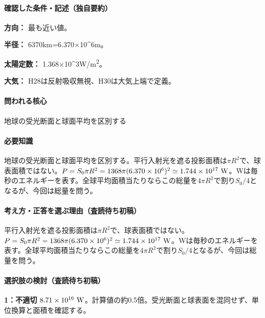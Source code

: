 \paragraph{確認した条件・記述（独自要約）}\mbox{}\par

\noindent\textbf{方向：} 最も近い値。\par

\noindent\textbf{半径：} 6370km=\allowbreak{}6.370×10\textasciicircum{}6m。\par

\noindent\textbf{太陽定数：} 1.368×10\textasciicircum{}3W/m\textsuperscript{2}。\par

\noindent\textbf{大気：} H28は反射吸収無視、H30は大気上端で定義。\par

\paragraph{問われる核心} 地球の受光断面と球面平均を区別する

\paragraph{必要知識} 地球の受光断面と球面平均を区別する。平行入射光を遮る投影面積は\(\pi R^2\)で、球表面積ではない。\(P=S_0\pi R^2=1368\pi(6.370\times10^6)^2\simeq1.744\times10^{17}\ {\rm W}\)。Wは毎秒のエネルギーを表す。全球平均面積当たりならこの総量を\(4\pi R^2\)で割り\(S_0/4\)となるが、今回は総量を問う。

\paragraph{考え方・正答を選ぶ理由（査読待ち初稿）} 平行入射光を遮る投影面積は\(\pi R^2\)で、球表面積ではない。\(P=S_0\pi R^2=1368\pi(6.370\times10^6)^2\simeq1.744\times10^{17}\ {\rm W}\)。Wは毎秒のエネルギーを表す。全球平均面積当たりならこの総量を\(4\pi R^2\)で割り\(S_0/4\)となるが、今回は総量を問う。

\paragraph{選択肢の検討（査読待ち初稿）}\mbox{}\par

\noindent\textbf{1：不適切} \(8.71\times10^{16}\ {\rm W}\)。計算値の約0.5倍。受光断面と球表面を混同せず、単位換算と面積を確認する。\par

